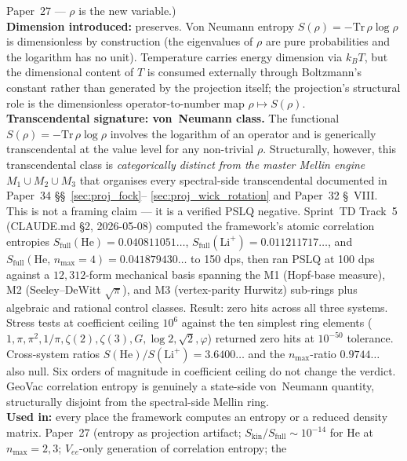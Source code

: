 \documentclass[11pt]{article}
\begin{document}
Paper~27 --- $\rho$ is the new variable.)\\
\textbf{Dimension introduced:} preserves.  Von Neumann entropy
$S(\rho) = -\mathrm{Tr}\,\rho\log\rho$ is dimensionless by
construction (the eigenvalues of $\rho$ are pure probabilities and the
logarithm has no unit).  Temperature carries energy dimension via
$k_B T$, but the dimensional content of $T$ is consumed externally
through Boltzmann's constant rather than generated by the projection
itself; the projection's structural role is the dimensionless
operator-to-number map $\rho \mapsto S(\rho)$.\\
\textbf{Transcendental signature: von~Neumann class.}  The functional
$S(\rho) = -\mathrm{Tr}\,\rho\log\rho$ involves the logarithm of an
operator and is generically transcendental at the value level for any
non-trivial $\rho$.  Structurally, however, this transcendental class
is \emph{categorically distinct from the master Mellin engine}
$M_1 \cup M_2 \cup M_3$ that organises every spectral-side
transcendental documented in Paper~34 \S\S~\ref{sec:proj_fock}--%
\ref{sec:proj_wick_rotation} and Paper~32 \S~VIII.  This is not a
framing claim --- it is a verified PSLQ negative.  Sprint~TD Track~5
(CLAUDE.md \S2, 2026-05-08) computed the framework's atomic
correlation entropies $S_\mathrm{full}(\mathrm{He}) =
0.040811051\ldots$, $S_\mathrm{full}(\mathrm{Li}^+) =
0.011211717\ldots$, and $S_\mathrm{full}(\mathrm{He},\, n_{\max}{=}4)
= 0.041879430\ldots$ to 150 dps, then ran PSLQ at 100 dps against a
$12{,}312$-form mechanical basis spanning the M1 (Hopf-base measure),
M2 (Seeley--DeWitt $\sqrt{\pi}$), and M3 (vertex-parity Hurwitz)
sub-rings plus algebraic and rational control classes.  Result: zero
hits across all three systems.  Stress tests at coefficient ceiling
$10^6$ against the ten simplest ring elements ($1, \pi, \pi^2, 1/\pi,
\zeta(2), \zeta(3), G, \log 2, \sqrt{2}, \varphi$) returned zero hits
at $10^{-50}$ tolerance.  Cross-system ratios
$S(\mathrm{He})/S(\mathrm{Li}^+) = 3.6400\ldots$ and the
$n_{\max}$-ratio $0.9744\ldots$ also null.  Six orders of magnitude in
coefficient ceiling do not change the verdict.  GeoVac correlation
entropy is genuinely a state-side von~Neumann quantity, structurally
disjoint from the spectral-side Mellin ring.\\
\textbf{Used in:} every place the framework computes an entropy or a
reduced density matrix.  Paper~27 (entropy as projection artifact;
$S_\mathrm{kin}/S_\mathrm{full} \sim 10^{-14}$ for He at
$n_{\max}=2,3$; $V_{ee}$-only generation of correlation entropy; the
\end{document}

